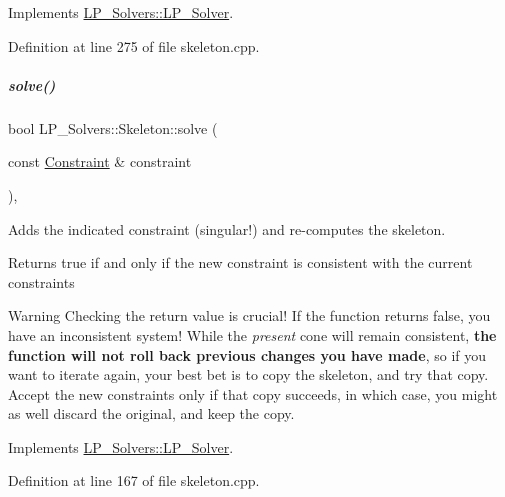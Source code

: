 Implements \hyperlink{group___c_l_s_solvers_aea1a5bf98a2c4c06b0550cacdf8b88fd}{L\+P\+\_\+\+Solvers\+::\+L\+P\+\_\+\+Solver}.



Definition at line 275 of file skeleton.\+cpp.

\mbox{\label{group___c_l_s_solvers_a3b0e821ab6a683ab4f936b7552074a15}} 
\subparagraph{\texorpdfstring{solve()}{solve()}\hspace{0.1cm}{\footnotesize\ttfamily [2/2]}}
{\footnotesize\ttfamily bool L\+P\+\_\+\+Solvers\+::\+Skeleton\+::solve (\begin{DoxyParamCaption}\item[{const \hyperlink{group___c_l_s_solvers_class_l_p___solvers_1_1_constraint}{Constraint} \&}]{constraint }\end{DoxyParamCaption})\hspace{0.3cm}{\ttfamily [override]}, {\ttfamily [virtual]}}



Adds the indicated constraint (singular!) and re-\/computes the skeleton. 

\begin{DoxyReturn}{Returns}
{\ttfamily true} if and only if the new constraint is consistent with the current constraints
\end{DoxyReturn}
\begin{DoxyWarning}{Warning}
Checking the return value is crucial! If the function returns {\ttfamily false}, you have an inconsistent system! While the {\itshape present} cone will remain consistent, {\bfseries the function will not roll back previous changes you have made}, so if you want to iterate again, your best bet is to copy the skeleton, and try that copy. Accept the new constraints only if that copy succeeds, in which case, you might as well discard the original, and keep the copy. 
\end{DoxyWarning}


Implements \hyperlink{group___c_l_s_solvers_a8b9979fb228ac9ccfe037ad6ca48b314}{L\+P\+\_\+\+Solvers\+::\+L\+P\+\_\+\+Solver}.



Definition at line 167 of file skeleton.\+cpp.



